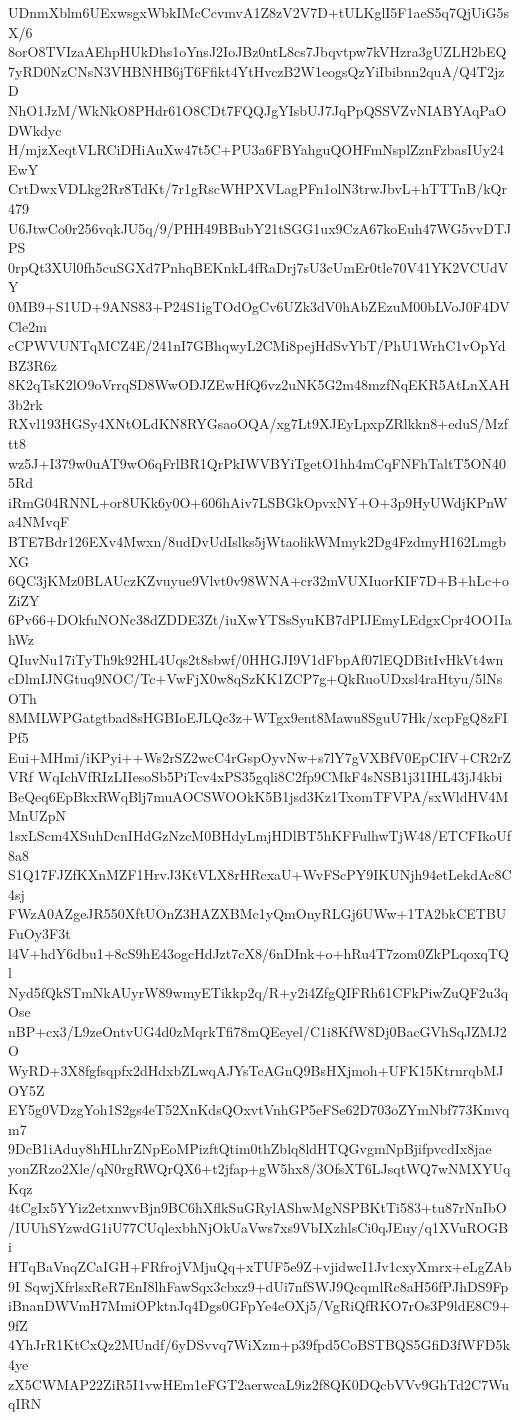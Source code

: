 UDnmXblm6UExwsgxWbkIMcCcvmvA1Z8zV2V7D+tULKglI5F1aeS5q7QjUiG5sX/6
8orO8TVIzaAEhpHUkDhs1oYnsJ2IoJBz0ntL8cs7Jbqvtpw7kVHzra3gUZLH2bEQ
7yRD0NzCNsN3VHBNHB6jT6Ffikt4YtHvczB2W1eogsQzYiIbibnn2quA/Q4T2jzD
NhO1JzM/WkNkO8PHdr61O8CDt7FQQJgYIsbUJ7JqPpQSSVZvNIABYAqPaODWkdyc
H/mjzXeqtVLRCiDHiAuXw47t5C+PU3a6FBYahguQOHFmNsplZznFzbasIUy24EwY
CrtDwxVDLkg2Rr8TdKt/7r1gRscWHPXVLagPFn1olN3trwJbvL+hTTTnB/kQr479
U6JtwCo0r256vqkJU5q/9/PHH49BBubY21tSGG1ux9CzA67koEuh47WG5vvDTJPS
0rpQt3XUl0fh5cuSGXd7PnhqBEKnkL4fRaDrj7sU3cUmEr0tle70V41YK2VCUdVY
0MB9+S1UD+9ANS83+P24S1igTOdOgCv6UZk3dV0hAbZEzuM00bLVoJ0F4DVCle2m
cCPWVUNTqMCZ4E/241nI7GBhqwyL2CMi8pejHdSvYbT/PhU1WrhC1vOpYdBZ3R6z
8K2qTsK2lO9oVrrqSD8WwODJZEwHfQ6vz2uNK5G2m48mzfNqEKR5AtLnXAH3b2rk
RXvl193HGSy4XNtOLdKN8RYGsaoOQA/xg7Lt9XJEyLpxpZRlkkn8+eduS/Mzftt8
wz5J+I379w0uAT9wO6qFrlBR1QrPkIWVBYiTgetO1hh4mCqFNFhTaltT5ON405Rd
iRmG04RNNL+or8UKk6y0O+606hAiv7LSBGkOpvxNY+O+3p9HyUWdjKPnWa4NMvqF
BTE7Bdr126EXv4Mwxn/8udDvUdIslks5jWtaolikWMmyk2Dg4FzdmyH162LmgbXG
6QC3jKMz0BLAUczKZvuyue9Vlvt0v98WNA+cr32mVUXIuorKIF7D+B+hLc+oZiZY
6Pv66+DOkfuNONc38dZDDE3Zt/iuXwYTSsSyuKB7dPIJEmyLEdgxCpr4OO1IahWz
QIuvNu17iTyTh9k92HL4Uqs2t8sbwf/0HHGJI9V1dFbpAf07lEQDBitIvHkVt4wn
cDlmIJNGtuq9NOC/Tc+VwFjX0w8qSzKK1ZCP7g+QkRuoUDxsl4raHtyu/5lNsOTh
8MMLWPGatgtbad8sHGBIoEJLQc3z+WTgx9ent8Mawu8SguU7Hk/xcpFgQ8zFIPf5
Eui+MHmi/iKPyi++Ws2rSZ2wcC4rGspOyvNw+s7lY7gVXBfV0EpCIfV+CR2rZVRf
WqIchVfRIzLIIesoSb5PiTcv4xPS35gqli8C2fp9CMkF4sNSB1j31IHL43jJ4kbi
BeQeq6EpBkxRWqBlj7muAOCSWOOkK5B1jsd3Kz1TxomTFVPA/sxWldHV4MMnUZpN
1sxLScm4XSuhDcnIHdGzNzcM0BHdyLmjHDlBT5hKFFulhwTjW48/ETCFIkoUf8a8
S1Q17FJZfKXnMZF1HrvJ3KtVLX8rHRcxaU+WvFScPY9IKUNjh94etLekdAc8C4sj
FWzA0AZgeJR550XftUOnZ3HAZXBMc1yQmOnyRLGj6UWw+1TA2bkCETBUFuOy3F3t
l4V+hdY6dbu1+8cS9hE43ogcHdJzt7cX8/6nDInk+o+hRu4T7zom0ZkPLqoxqTQl
Nyd5fQkSTmNkAUyrW89wmyETikkp2q/R+y2i4ZfgQIFRh61CFkPiwZuQF2u3qOse
nBP+cx3/L9zeOntvUG4d0zMqrkTfi78mQEeyel/C1i8KfW8Dj0BacGVhSqJZMJ2O
WyRD+3X8fgfsqpfx2dHdxbZLwqAJYsTcAGnQ9BsHXjmoh+UFK15KtrnrqbMJOY5Z
EY5g0VDzgYoh1S2gs4eT52XnKdsQOxvtVnhGP5eFSe62D703oZYmNbf773Kmvqm7
9DcB1iAduy8hHLhrZNpEoMPizftQtim0thZblq8ldHTQGvgmNpBjifpvcdIx8jae
yonZRzo2Xle/qN0rgRWQrQX6+t2jfap+gW5hx8/3OfsXT6LJsqtWQ7wNMXYUqKqz
4tCgIx5YYiz2etxnwvBjn9BC6hXflkSuGRylAShwMgNSPBKtTi583+tu87rNnIbO
/IUUhSYzwdG1iU77CUqlexbhNjOkUaVws7xs9VbIXzhlsCi0qJEuy/q1XVuROGBi
HTqBaVnqZCaIGH+FRfrojVMjuQq+xTUF5e9Z+vjidwcI1Jv1cxyXmrx+eLgZAb9I
SqwjXfrlsxReR7EnI8lhFawSqx3cbxz9+dUi7nfSWJ9QcqmlRc8aH56fPJhDS9Fp
iBnanDWVmH7MmiOPktnJq4Dgs0GFpYe4eOXj5/VgRiQfRKO7rOs3P9ldE8C9+9fZ
4YhJrR1KtCxQz2MUndf/6yDSvvq7WiXzm+p39fpd5CoBSTBQS5GfiD3fWFD5k4ye
zX5CWMAP22ZiR5I1vwHEm1eFGT2aerwcaL9iz2f8QK0DQcbVVv9GhTd2C7WuqIRN
